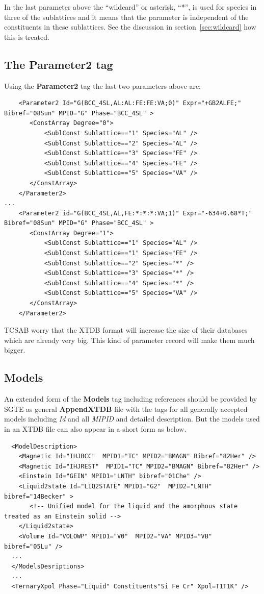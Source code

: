 \documentclass{article}
\begin{document}
\begin{appendices}
In the last parameter above the ``wildcard'' or asterisk, ``*'', is
used for species in three of the sublattices and it means that the
parameter is independent of the constituents in these sublattices.
See the discussion in section~\ref{sec:wildcard} how this is treated.


\subsection{The Parameter2 tag}

Using the {\bf Parameter2} tag the last two parameters above are:

{\small
\begin{verbatim}
    <Parameter2 Id="G(BCC_4SL,AL:AL:FE:FE:VA;0)" Expr="+GB2ALFE;" Bibref="08Sun" MPID="G" Phase="BCC_4SL" >
       <ConstArray Degree="0">
           <SublConst Sublattice=="1" Species="AL" />
           <SublConst Sublattice=="2" Species="AL" />
           <SublConst Sublattice=="3" Species="FE" />
           <SublConst Sublattice=="4" Species="FE" />
           <SublConst Sublattice=="5" Species="VA" />
       </ConstArray>
    </Parameter2>
...
    <Parameter2 id="G(BCC_4SL,AL,FE:*:*:*:VA;1)" Expr="-634+0.68*T;" Bibref="08Sun" MPID="G" Phase="BCC_4SL" >
       <ConstArray Degree="1">
           <SublConst Sublattice=="1" Species="AL" />
           <SublConst Sublattice=="1" Species="FE" />
           <SublConst Sublattice=="2" Species="*" />
           <SublConst Sublattice=="3" Species="*" />
           <SublConst Sublattice=="4" Species="*" />
           <SublConst Sublattice=="5" Species="VA" />
       </ConstArray>
    </Parameter2>
\end{verbatim}
}

TCSAB worry that the XTDB format will increase the size of their
databases which are already very big.  This kind of parameter record
will make them much bigger.

\subsection{Models}\label{sec:modelex}

An extended form of the {\bf Models} tag including references should
be provided by SGTE as general {\bf AppendXTDB} file with the tags
for all generally accepted models including {\em Id} and all {\em
  MIPID} and detailed description.  But the models used in an XTDB
file can also appear in a short form as below.

{\small
\begin{verbatim}
  <ModelDescription>
    <Magnetic Id="IHJBCC"  MPID1="TC" MPID2="BMAGN" Bibref="82Her" />
    <Magnetic Id="IHJREST"  MPID1="TC" MPID2="BMAGN" Bibref="82Her" />
    <Einstein Id="GEIN" MPID1="LNTH" bibref="01Che" /> 
    <Liquid2state Id="LIQ2STATE" MPID1="G2"  MPID2="LNTH" bibref="14Becker" >
       <!-- Unified model for the liquid and the amorphous state treated as an Einstein solid -->
    </Liquid2state>
    <Volume Id="VOLOWP" MPID1="V0"  MPID2="VA" MPID3="VB" bibref="05Lu" />
  ...
  </ModelsDesriptions>
  ...
  <TernaryXpol Phase="Liquid" Constituents"Si Fe Cr" Xpol=T1T1K" />
\end{verbatim}
}


\end{appendices}
\end{document}
